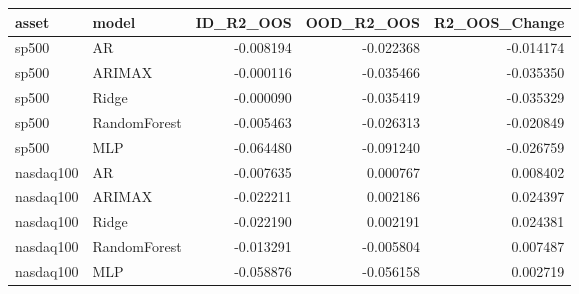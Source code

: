 \begin{tabular}{llrrr}
\toprule
asset & model & ID_R2_OOS & OOD_R2_OOS & R2_OOS_Change \\
\midrule
sp500 & AR & -0.008194 & -0.022368 & -0.014174 \\
sp500 & ARIMAX & -0.000116 & -0.035466 & -0.035350 \\
sp500 & Ridge & -0.000090 & -0.035419 & -0.035329 \\
sp500 & RandomForest & -0.005463 & -0.026313 & -0.020849 \\
sp500 & MLP & -0.064480 & -0.091240 & -0.026759 \\
nasdaq100 & AR & -0.007635 & 0.000767 & 0.008402 \\
nasdaq100 & ARIMAX & -0.022211 & 0.002186 & 0.024397 \\
nasdaq100 & Ridge & -0.022190 & 0.002191 & 0.024381 \\
nasdaq100 & RandomForest & -0.013291 & -0.005804 & 0.007487 \\
nasdaq100 & MLP & -0.058876 & -0.056158 & 0.002719 \\
\bottomrule
\end{tabular}
